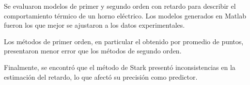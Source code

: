 Se evaluaron modelos de primer y segundo orden con retardo para describir
el comportamiento térmico de un horno eléctrico. Los modelos generados en
Matlab fueron los que mejor se ajustaron a los datos experimentales.

Los métodos de primer orden, en particular el obtenido por promedio de
puntos, presentaron menor error que los métodos de segundo orden.

Finalmente, se encontró que el método de Stark presentó inconsistencias en
la estimación del retardo, lo que afectó su precisión como predictor.
